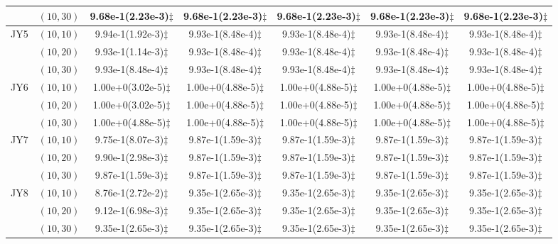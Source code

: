 \documentclass[review]{elsarticle}
\begin{document}
\begin{table*}[!htb]
{\begin{tabular}{ccccccc}
&$(10,30)$ &9.68e-1(2.23e-3)$\ddagger$ &9.68e-1(2.23e-3)$\ddagger$ &9.68e-1(2.23e-3)$\ddagger$ &9.68e-1(2.23e-3)$\ddagger$ &9.68e-1(2.23e-3)$\ddagger$ \\
\hline  \multirow{3}{*}{JY5}
&$(10,10)$ &9.94e-1(1.92e-3)$\ddagger$ &9.93e-1(8.48e-4)$\ddagger$ &9.93e-1(8.48e-4)$\ddagger$ &9.93e-1(8.48e-4)$\ddagger$ &9.93e-1(8.48e-4)$\ddagger$ \\
&$(10,20)$ &9.93e-1(1.14e-3)$\ddagger$ &9.93e-1(8.48e-4)$\ddagger$ &9.93e-1(8.48e-4)$\ddagger$ &9.93e-1(8.48e-4)$\ddagger$ &9.93e-1(8.48e-4)$\ddagger$ \\
&$(10,30)$ &9.93e-1(8.48e-4)$\ddagger$ &9.93e-1(8.48e-4)$\ddagger$ &9.93e-1(8.48e-4)$\ddagger$ &9.93e-1(8.48e-4)$\ddagger$ &9.93e-1(8.48e-4)$\ddagger$ \\
\hline  \multirow{3}{*}{JY6}
&$(10,10)$ &1.00e+0(3.02e-5)$\ddagger$ &1.00e+0(4.88e-5)$\ddagger$ &1.00e+0(4.88e-5)$\ddagger$ &1.00e+0(4.88e-5)$\ddagger$ &1.00e+0(4.88e-5)$\ddagger$ \\
&$(10,20)$ &1.00e+0(3.02e-5)$\ddagger$ &1.00e+0(4.88e-5)$\ddagger$ &1.00e+0(4.88e-5)$\ddagger$ &1.00e+0(4.88e-5)$\ddagger$ &1.00e+0(4.88e-5)$\ddagger$ \\
&$(10,30)$ &1.00e+0(4.88e-5)$\ddagger$ &1.00e+0(4.88e-5)$\ddagger$ &1.00e+0(4.88e-5)$\ddagger$ &1.00e+0(4.88e-5)$\ddagger$ &1.00e+0(4.88e-5)$\ddagger$ \\
\hline  \multirow{3}{*}{JY7}
&$(10,10)$ &9.75e-1(8.07e-3)$\ddagger$ &9.87e-1(1.59e-3)$\ddagger$ &9.87e-1(1.59e-3)$\ddagger$ &9.87e-1(1.59e-3)$\ddagger$ &9.87e-1(1.59e-3)$\ddagger$ \\
&$(10,20)$ &9.90e-1(2.98e-3)$\ddagger$ &9.87e-1(1.59e-3)$\ddagger$ &9.87e-1(1.59e-3)$\ddagger$ &9.87e-1(1.59e-3)$\ddagger$ &9.87e-1(1.59e-3)$\ddagger$ \\
&$(10,30)$ &9.87e-1(1.59e-3)$\ddagger$ &9.87e-1(1.59e-3)$\ddagger$ &9.87e-1(1.59e-3)$\ddagger$ &9.87e-1(1.59e-3)$\ddagger$ &9.87e-1(1.59e-3)$\ddagger$ \\
\hline  \multirow{3}{*}{JY8}
&$(10,10)$ &8.76e-1(2.72e-2)$\ddagger$ &9.35e-1(2.65e-3)$\ddagger$ &9.35e-1(2.65e-3)$\ddagger$ &9.35e-1(2.65e-3)$\ddagger$ &9.35e-1(2.65e-3)$\ddagger$ \\
&$(10,20)$ &9.12e-1(6.98e-3)$\ddagger$ &9.35e-1(2.65e-3)$\ddagger$ &9.35e-1(2.65e-3)$\ddagger$ &9.35e-1(2.65e-3)$\ddagger$ &9.35e-1(2.65e-3)$\ddagger$ \\
&$(10,30)$ &9.35e-1(2.65e-3)$\ddagger$ &9.35e-1(2.65e-3)$\ddagger$ &9.35e-1(2.65e-3)$\ddagger$ &9.35e-1(2.65e-3)$\ddagger$ &9.35e-1(2.65e-3)$\ddagger$ \\

\end{tabular}}
\end{table*}
\end{document}
